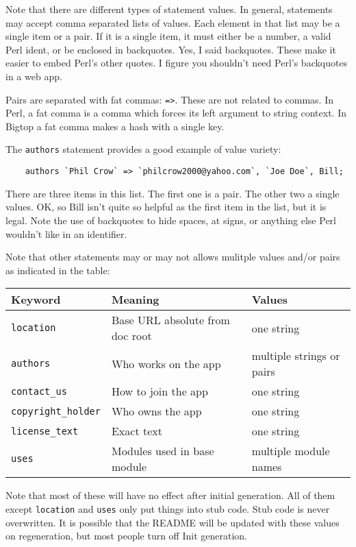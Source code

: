 Note that there are different types of statement values.  In general,
statements may accept comma separated lists of values.  Each element in
that list may be a single item or a pair.  If it is a single item,
it must either be a number, a valid Perl ident, or be enclosed in backquotes.
Yes, I said backquotes.  These make it easier to embed Perl's other quotes.
I figure you shouldn't need Perl's backquotes in a web app.

Pairs are separated with fat commas: \verb+=>+.  These are not related
to commas.  In Perl, a fat comma is a comma which forces its left argument
to string context.  In Bigtop a fat comma makes a hash with a single key.

The \verb+authors+ statement provides a good example of value variety:

\begin{verbatim}
    authors `Phil Crow` => `philcrow2000@yahoo.com`, `Joe Doe`, Bill;
\end{verbatim}

There are three items in this list.  The first one is a pair.  The other
two a single values.  OK, so Bill isn't quite so helpful as the first item
in the list, but it is legal.  Note the use of backquotes to hide spaces,
at signs, or anything else Perl wouldn't like in an identifier.

Note that other statements may or may not allows mulitple values and/or
pairs as indicated in the table:

\begin{tabular}{l|l|l}
Keyword & Meaning & Values \\
\hline
\verb+location+         & Base URL absolute from doc root & one string \\
\verb+authors+          & Who works on the app & multiple strings or pairs\\
\verb+contact_us+       & How to join the app & one string \\
\verb+copyright_holder+ & Who owns the app & one string \\
\verb+license_text+     & Exact text & one string \\
\verb+uses+             & Modules used in base module & multiple module names\\
\end{tabular}

Note that most of these will have no effect after initial generation.
All of them except \verb+location+ and \verb+uses+ only put things into
stub code.  Stub code is never overwritten.  It is possible that the
README will be updated with these values on regeneration, but most people
turn off Init generation.

